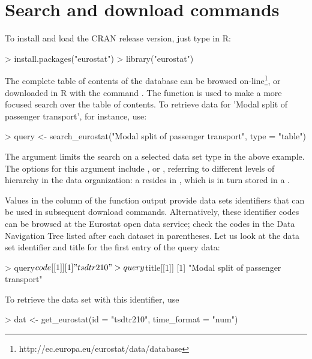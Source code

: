 \section{Search and download commands}

To install and load the CRAN release version, just type in R:

\begin{example}
> install.packages("eurostat")
> library("eurostat")
\end{example}

The complete table of contents of the database can be browsed
on-line\footnote{http://ec.europa.eu/eurostat/data/database}, or
downloaded in R with the command . The function  is used
to make a more focused search over the table of contents. To retrieve
data for 'Modal split of passenger transport', for instance, use:

\begin{example}
> query <- search_eurostat("Modal split of passenger transport", type = "table")
\end{example}

The  argument limits the search on a selected data set type
in the above example. The options for this argument
include ,  or , referring to
different levels of hierarchy in the data organization: a 
resides in , which is in turn stored in a
.

Values in the  column of the 
function output provide data sets identifiers that can be used in
subsequent download commands. Alternatively, these identifier codes
can be browsed at the Eurostat open data service; check the codes in
the Data Navigation Tree listed after each dataset in parentheses. Let
us look at the data set identifier and title for the first entry of
the query data:

\begin{example}
> query$code[[1]]
[1] "tsdtr210"

> query$title[[1]]
[1] "Modal split of passenger transport"
\end{example}


To retrieve the data set with this identifier, use

\begin{example}
> dat <- get_eurostat(id = "tsdtr210", time_format = "num")
\end{example}

